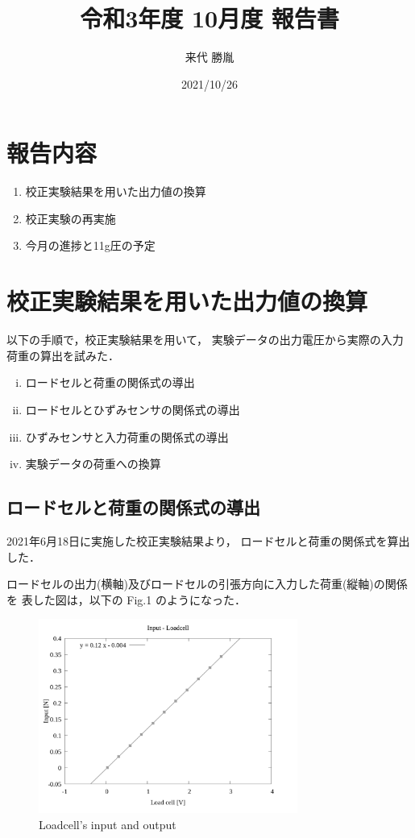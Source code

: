 \documentclass[twocolumn,a4j]{jsarticle}
\author{来代 勝胤}
\title{令和3年度 10月度 報告書}
\date{2021/10/26}
\begin{document}
\columnseprule=0.1mm

\maketitle
\section*{報告内容}
\begin{enumerate}[1.]
    \item 校正実験結果を用いた出力値の換算
    \item 校正実験の再実施
    \item 今月の進捗と11g圧の予定
\end{enumerate}

\section{校正実験結果を用いた出力値の換算}
以下の手順で，校正実験結果を用いて，
実験データの出力電圧から実際の入力荷重の算出を試みた．
\begin{enumerate}[(i)]
    \item ロードセルと荷重の関係式の導出
    \item ロードセルとひずみセンサの関係式の導出
    \item ひずみセンサと入力荷重の関係式の導出
    \item 実験データの荷重への換算
\end{enumerate}
\subsection{ロードセルと荷重の関係式の導出}
2021年6月18日に実施した校正実験結果より，
ロードセルと荷重の関係式を算出した．\par
ロードセルの出力(横軸)及びロードセルの引張方向に入力した荷重(縦軸)の関係を
表した図は，以下の Fig.1 のようになった．
\begin{figure}[htbp]
    \footnotesize
    \begin{center}
        \includegraphics[width=85mm]{../images/02_force&line.png}
        \caption{Loadcell's input and output}
    \end{center}
\end{figure}
\end{document}

